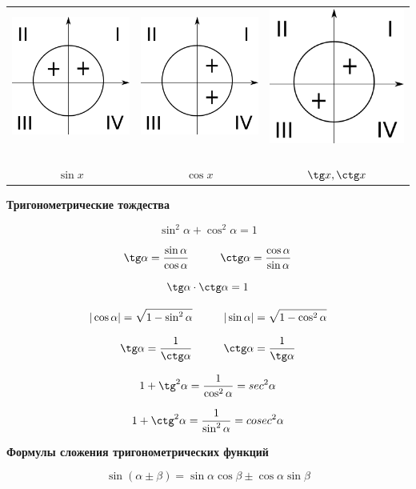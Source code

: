\documentclass[a4paper, 14pt]{extarticle}
\begin{document}
{\begin{center}
\begin{tabular}{ccc}
\includegraphics[width=0.25\linewidth]{img01.png} \ & \includegraphics[width=0.25\linewidth]{img02.png} \ & \includegraphics[width=0.25\linewidth]{img03.png} \ \\ 
$\sin x$ & $\cos x$ & $\tg x, \ctg x$ \\ 
\end{tabular} 
\end{center}

\textbf{Тригонометрические тождества}

$$\sin^2\alpha+\cos^2\alpha=1$$

$$\tg\alpha =\frac{\sin\alpha}{\cos\alpha}
\hskip 1cm
\ctg\alpha =\frac{\cos\alpha}{\sin\alpha}$$

$$\tg\alpha \cdot \ctg\alpha = 1$$

$$|\cos \alpha |=\sqrt{1-\sin^2\alpha}
\hskip 1cm
|\sin \alpha |=\sqrt{1-\cos^2\alpha}$$

$$\tg\alpha = \frac{1}{\ctg\alpha}
\hskip 1cm
\ctg\alpha = \frac{1}{\tg\alpha}$$

$$1+\tg^2\alpha =\frac{1}{\cos^2\alpha}=sec^2\alpha$$

$$1+\ctg^2\alpha =\frac{1}{\sin^2\alpha}=cosec^2\alpha$$

\textbf{Формулы сложения тригонометрических функций}

$$\sin(\alpha \pm \beta )=\sin \alpha \cos \beta \pm \cos \alpha \sin \beta $$

}
\end{document}

